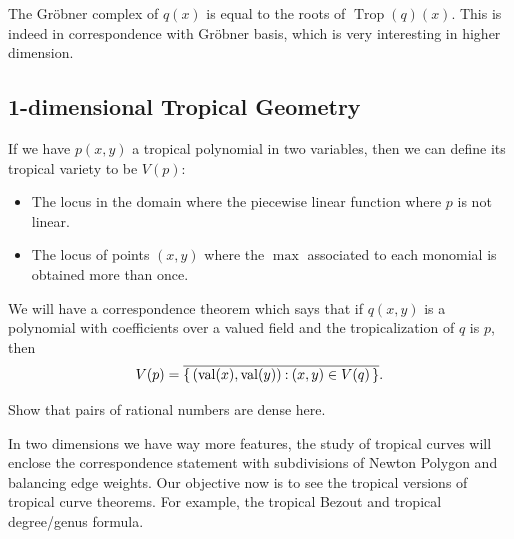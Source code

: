 \documentclass[12pt]{memoir}
\DeclareMathOperator{\val}{val}
\DeclareMathOperator{\Trop}{Trop}
\begin{document}
The Gr\"obner complex of $q(x)$ is equal to the roots of $\Trop(q)(x)$. This is indeed in correspondence with Gr\"obner basis, which is very interesting in higher dimension. 

\subsection{1-dimensional Tropical Geometry}

If we have $p(x,y)$ a tropical polynomial in two variables, then we can define its tropical variety to be $V(p)$:
\begin{itemize}
    \item The locus in the domain where the piecewise linear function where $p$ is not linear.
    \item The locus of points $(x,y)$ where the $\max$ associated to each monomial is obtained more than once.
\end{itemize}

We will have a correspondence theorem which says that if $q(x,y)$ is a polynomial with coefficients over a valued field and the tropicalization of $q$ is $p$, then 
$$V(p)=\ov{\set{(\val(x),\val(y))\: (x,y)\in V(q)}}.$$
\begin{Ej}
Show that pairs of rational numbers are dense here. 
\end{Ej}
In two dimensions we have way more features, the study of tropical curves will enclose the correspondence statement with subdivisions of Newton Polygon and balancing edge weights. Our objective now is to see the tropical versions of tropical curve theorems. For example, the tropical Bezout and tropical degree/genus formula.

\ifx\nextra\undefined
\printindex
\else\fi
\nocite{*}


\end{document}
